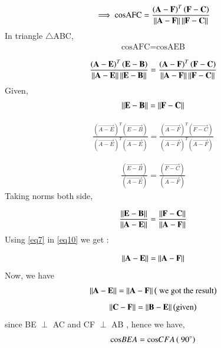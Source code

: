 \documentclass[journal,12pt,twocolumn]{IEEEtran}
\begin{document}
\begin{align}
\implies \text{cosAFC} = \frac{\left( \mathbf{A-F} \right)^T  \left( \mathbf{F - C } \right)}{\left\lVert\mathbf{A - F}\right\rVert \left\lVert\mathbf{F - C}\right\rVert}
\end{align}
 In triangle $\triangle$ABC, 
 \begin{align}
 \text{cosAFC} = \text{cosAEB}
 \end{align}
 
 \begin{align}
\frac{\left( \mathbf{A-E} \right)^T  \left( \mathbf{E - B } \right)}{\left\lVert\mathbf{A - E}\right\rVert \left\lVert\mathbf{E - B}\right\rVert} =  \frac{\left( \mathbf{A-F} \right)^T  \left( \mathbf{F - C } \right)}{\left\lVert\mathbf{A - F}\right\rVert \left\lVert\mathbf{F - C}\right\rVert}
 \end{align}
Given,  
\begin{align}
\left\lVert\mathbf{E - B}\right\rVert = \left\lVert\mathbf{F - C}\right\rVert \label{eq7}
\end{align}


\begin{align}
\frac{ \left( \vec{A-E} \right)^T  \left( \vec{E - B } \right)}{\left ( \vec{A - E} \right )^T \left ( \vec{A - E} \right ) }  =   \frac{ \left( \vec{A-F} \right)^T  \left( \vec{F - C } \right)} { \left ( \vec{A - F}  \right )^T \left ( \vec{A - F} \right ) }
\end{align}

\begin{align}
\frac{ \left( \vec{E - B } \right)}{ \left ( \vec{A - E} \right ) } =  \frac{ \left( \vec{F - C } \right)} { \left ( \vec{A - F} \right ) }
\end{align}
Taking norms both side,
 
\begin{align}
\frac{ \left\lVert \mathbf{E - B }\right\rVert }{ \left\lVert \mathbf{A - E}\right\rVert } =  \frac{ \left\lVert\mathbf{F - C }\right\rVert}{\left\lVert\mathbf{A - F}\right\rVert} \label{eq10}
\end{align}
 Using \ref{eq7} in \ref{eq10} we get :
 
 
 
 \begin{align}
 \left\lVert \mathbf{A - E}\right\rVert =  \left\lVert\mathbf{A - F}\right\rVert \label{eq11}
 \end{align}
 Now, we have
 \begin{align}
\left\lVert \mathbf{A - E}\right\rVert =  \left\lVert\mathbf{A - F}\right\rVert \label{eq12} \left( \text{ we got the result} \right)
\end{align}
 \begin{align}
  \left\lVert \mathbf{C - F}\right\rVert =  \left\lVert\mathbf{B - E}\right\rVert  \left( \text{given} \right) 
 \end{align}
 since BE $\perp$ AC and CF $\perp$ AB  , hence we have,
  \begin{align}
   \text{cos}BEA =  \text{cos}CFA \left( \text{ 90\degree } \right)   \label{eq1.14}
 \end{align}  
   
\end{document}
